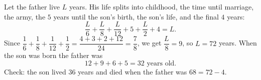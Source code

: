 Let the father live $L$ years. His life splits into childhood, the time until marriage, the army, the $5$ years until the son's birth, the son's life, and the final $4$ years:
\[
\dfrac {L}{6}+\dfrac {L}{8}+\dfrac {L}{12}+5+\dfrac {L}{2}+4=L .
\]
Since $\dfrac{1}{6}+\dfrac{1}{8}+\dfrac{1}{12}+\dfrac{1}{2}=\dfrac{4+3+2+12}{24}=\dfrac{7}{8}$, we get $\dfrac {L}{8}=9$, so $L=\boxed{72}$ years. When the son was born the father was
\[
12+9+6+5=\boxed{32}\text{ years old}.
\]
Check: the son lived $36$ years and died when the father was $68=72-4$.
